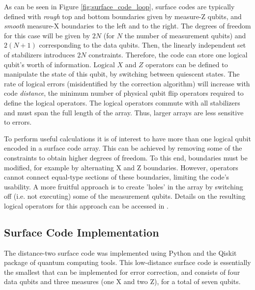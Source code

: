 As can be seen in Figure \ref{fig:surface_code_loop}, surface codes are typically defined with \textit{rough} top and bottom boundaries given by measure-Z qubits, and \textit{smooth} measure-X boundaries to the left and to the right. The degrees of freedom for this case will be given by $2N$ (for $N$ the number of measurement qubits) and $2(N+1)$ corresponding to the data qubits. Then, the linearly independent set of stabilizers introduces $2N$ constraints. Therefore, the code can store one logical qubit's worth of information. Logical $X$ and $Z$ operators can be defined to manipulate the state of this qubit, by switching between quiescent states. The rate of logical errors (misidentified by the correction algorithm) will increase with code \textit{distance}, the minimum number of physical qubit flip operators required to define the logical operators. The logical operators commute with all stabilizers and must span the full length of the array. Thus, larger arrays are less sensitive to errors. 

To perform useful calculations it is of interest to have more than one logical qubit encoded in a surface code array. This can be achieved by removing some of the constraints to obtain higher degrees of freedom. To this end, boundaries must be modified, for example by alternating X and Z boundaries. However, operators cannot connect equal-type sections of these boundaries, limiting the code's usability. A more fruitful approach is to create 'holes' in the array by switching off (i.e. not executing) some of the measurement qubits. Details on the resulting logical operators for this approach can be accessed in \cite{Fowler2012}.

\subsection{Surface Code Implementation}

The distance-two surface code was implemented using Python and the Qiskit package of quantum computing tools. This low-distance surface code is essentially the smallest that can be implemented for error correction, and consists of four data qubits and three measures (one X and two Z), for a total of seven qubits.

